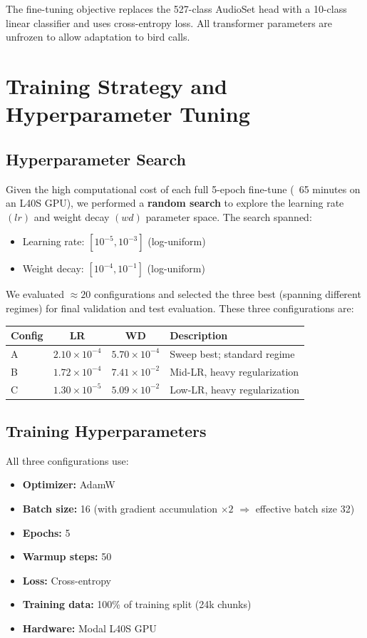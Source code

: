 \documentclass[11pt, a4paper]{article}
\begin{document}
\noindent
The fine-tuning objective replaces the 527-class AudioSet head with a 10-class linear classifier and uses cross-entropy loss. All transformer parameters are unfrozen to allow adaptation to bird calls.

\section{Training Strategy and Hyperparameter Tuning}

\subsection{Hyperparameter Search}
Given the high computational cost of each full 5-epoch fine-tune (~65 minutes on an L40S GPU), we performed a \textbf{random search} to explore the learning rate $(lr)$ and weight decay $(wd)$ parameter space. The search spanned:
\begin{itemize}
  \item Learning rate: $[10^{-5}, 10^{-3}]$ (log-uniform)
  \item Weight decay: $[10^{-4}, 10^{-1}]$ (log-uniform)
\end{itemize}

\noindent
We evaluated $\approx 20$ configurations and selected the three best (spanning different regimes) for final validation and test evaluation. These three configurations are:

\begin{center}
\begin{tabular}{lccl}
  \toprule
  \textbf{Config} & \textbf{LR} & \textbf{WD} & \textbf{Description} \\
  \midrule
  A & $2.10 \times 10^{-4}$ & $5.70 \times 10^{-4}$ & Sweep best; standard regime \\
  B & $1.72 \times 10^{-4}$ & $7.41 \times 10^{-2}$ & Mid-LR, heavy regularization \\
  C & $1.30 \times 10^{-5}$ & $5.09 \times 10^{-2}$ & Low-LR, heavy regularization \\
  \bottomrule
\end{tabular}
\end{center}

\subsection{Training Hyperparameters}
All three configurations use:
\begin{itemize}
  \item \textbf{Optimizer:} AdamW
  \item \textbf{Batch size:} 16 (with gradient accumulation $\times 2$ $\Rightarrow$ effective batch size 32)
  \item \textbf{Epochs:} 5
  \item \textbf{Warmup steps:} 50
  \item \textbf{Loss:} Cross-entropy
  \item \textbf{Training data:} 100\% of training split (24k chunks)
  \item \textbf{Hardware:} Modal L40S GPU
\end{itemize}
\end{document}
